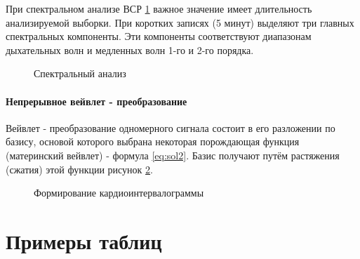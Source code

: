 \documentclass[a4paper,12pt]{article}         %
\begin{document}
При спектральном анализе ВСР \ref{fig:i2} важное значение имеет длительность анализируемой выборки. При коротких записях (5 минут) выделяют три главных спектральных компоненты. Эти компоненты соответствуют диапазонам дыхательных волн и медленных волн 1-го и 2-го порядка. 

\begin{figure}[t]
	\caption{Спектральный анализ}
	\label{fig:i2}
\end{figure}

\paragraph{Непрерывное вейвлет - преобразование}
Вейвлет - преобразование одномерного сигнала состоит в его разложении по базису, основой которого выбрана некоторая порождающая функция (материнский вейвлет) - формула  \ref{eq:sol2}. Базис получают путём растяжения (сжатия) этой функции рисунок \ref{fig:i3}.

\begin{figure}[b]
	\caption{Формирование кардиоинтервалограммы}
	\label{fig:i3}
\end{figure}



\newpage
\section{Примеры таблиц}
\end{document}
